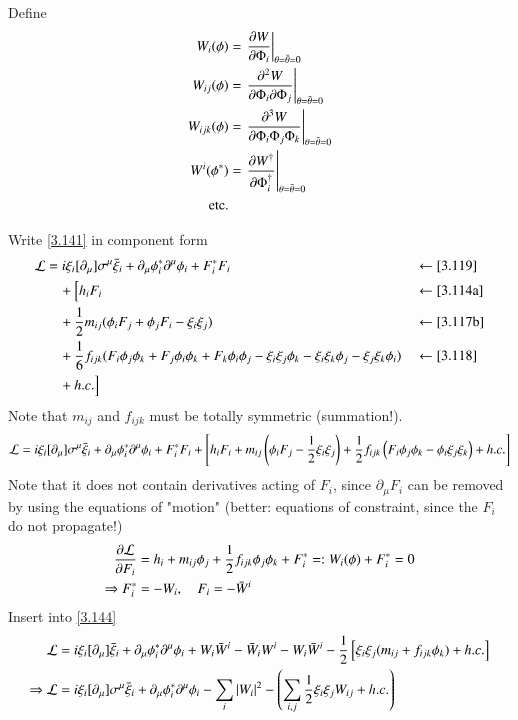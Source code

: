 Define
\begin{subequations}
\label{3.143}
\begin{align}
   W_i (\phi) &=  \eval{\pdv{W}{\Phi_i}}_{\theta=\bar\theta=0}  \label{3.143a} \\
   W_{ij} (\phi) &= \eval{\pdv{W}{\Phi_i}{\Phi_j}}_{\theta=\bar\theta=0}  \label{3.143a} \\
   W_{ijk} (\phi) &= \eval{\frac{\partial^3 W}{\partial \Phi_i \Phi_j \Phi_k}}_{\theta=\bar\theta=0}  \label{3.143a} \\
   W^i (\phi^*) &= \eval{\pdv{W^\dagger}{\Phi_i^\dagger}}_{\theta=\bar\theta=0} \label{3.143d} \\
   \text{etc.} \notag
\end{align}
\end{subequations}

Write \eqref{3.141} in component form
\begin{alignat*}{2}
   \mathcal{L} &= i \xi_i [\partial_\mu] \sigma^\mu \bar\xi_i + \partial_\mu \phi_i^* \partial^\mu \phi_i + F_i^* F_i && \leftarrow \eqref{3.119}\\
        &\quad +\Big[ h_i F_i &&\leftarrow \eqref{3.114a} \\
        &\quad +\frac{1}{2} m_{ij} (\phi_i F_j + \phi_j F_i - \xi_i \xi_j) &&\leftarrow \eqref{3.117b}\\
        &\quad + \frac{1}{6} f_{ijk} (F_i \phi_j \phi_k + F_j \phi_i \phi_k + F_k \phi_i \phi_j - \xi_i \xi_j \phi_k - \xi_i\xi_k \phi_j - \xi_j \xi_k \phi_i) &&\leftarrow \eqref{3.118} \\
        & \quad + h.c. \Big]  &&
\end{alignat*}
Note that $m_{ij}$ and $f_{ijk}$ must be totally symmetric (summation!).
\begin{equation}
   \mathcal{L} = i \xi_i [\partial_\mu] \sigma^\mu \bar\xi_i + \partial_\mu \phi_i^* \partial^\mu \phi_i + F_i^* F_i + \left[ h_i F_i + m_{ij} \left( \phi_i F_j - \frac{1}{2} \xi_i \xi_j \right) + \frac{1}{2} f_{ijk} \left( F_i \phi_j \phi_k - \phi_i \xi_j \xi_k \right) + h.c. \right] \label{3.144}
\end{equation}
Note that it does not contain derivatives acting of $F_i$, since $\partial_\mu F_i$ can be removed by using the equations of "motion" (better: equations of constraint, since the $F_i$ do not propagate!)
\begin{align}
   \pdv{\mathcal{L}}{F_i} &= h_i + m_{ij} \phi_j + \frac{1}{2} f_{ijk} \phi_j \phi_k + F_i^* =: W_i (\phi) + F_i^* = 0 \notag \\
   \Rightarrow F_i^* &= - W_i,\quad F_i = - \bar W^i \label{3.145}
\end{align}
Insert into \eqref{3.144}
\begin{align}
   \mathcal{L} &= i \xi_i [\partial_\mu] \bar\xi_i + \partial_\mu \phi_i^* \partial^\mu \phi_i + W_i \bar W^i - \bar W_i W^i - W_i \bar W^i - \frac{1}{2} \left[ \xi_i \xi_j (m_{ij} + f_{ijk}\phi_k ) +h.c. \right] \notag \\
   \Rightarrow \mathcal{L} &= i\xi_i [\partial_\mu ] \sigma^\mu \bar\xi_i + \partial_\mu \phi_i^* \partial^\mu \phi_i - \sum_i |W_i|^2 - \left(\sum_{i,j} \frac{1}{2} \xi_i \xi_j W_{ij} + h.c. \right) \label{3.146}
\end{align}

